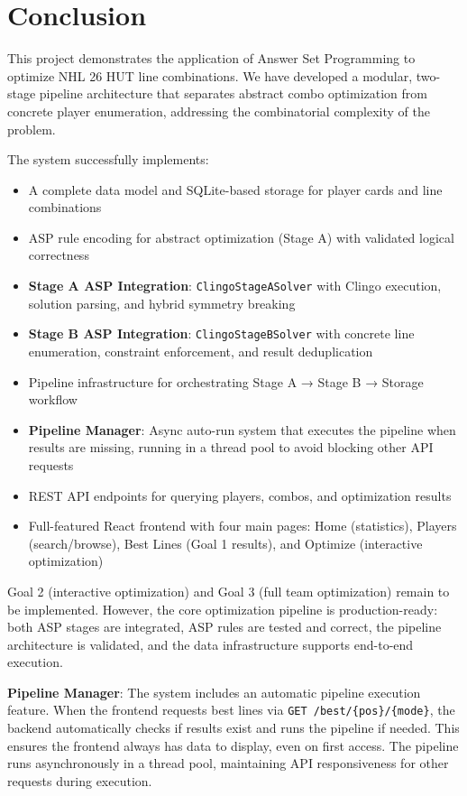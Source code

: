 \section{Conclusion}

This project demonstrates the application of Answer Set Programming to optimize NHL 26 HUT line combinations. We have developed a modular, two-stage pipeline architecture that separates abstract combo optimization from concrete player enumeration, addressing the combinatorial complexity of the problem.

The system successfully implements:
\begin{itemize}
    \item A complete data model and SQLite-based storage for player cards and line combinations
    \item ASP rule encoding for abstract optimization (Stage A) with validated logical correctness
    \item \textbf{Stage A ASP Integration}: \texttt{ClingoStageASolver} with Clingo execution, solution parsing, and hybrid symmetry breaking
    \item \textbf{Stage B ASP Integration}: \texttt{ClingoStageBSolver} with concrete line enumeration, constraint enforcement, and result deduplication
    \item Pipeline infrastructure for orchestrating Stage A → Stage B → Storage workflow
    \item \textbf{Pipeline Manager}: Async auto-run system that executes the pipeline when results are missing, running in a thread pool to avoid blocking other API requests
    \item REST API endpoints for querying players, combos, and optimization results
    \item Full-featured React frontend with four main pages: Home (statistics), Players (search/browse), Best Lines (Goal 1 results), and Optimize (interactive optimization)
\end{itemize}

Goal 2 (interactive optimization) and Goal 3 (full team optimization) remain to be implemented. However, the core optimization pipeline is production-ready: both ASP stages are integrated, ASP rules are tested and correct, the pipeline architecture is validated, and the data infrastructure supports end-to-end execution.

\textbf{Pipeline Manager}: The system includes an automatic pipeline execution feature. When the frontend requests best lines via \texttt{GET /best/\{pos\}/\{mode\}}, the backend automatically checks if results exist and runs the pipeline if needed. This ensures the frontend always has data to display, even on first access. The pipeline runs asynchronously in a thread pool, maintaining API responsiveness for other requests during execution.

